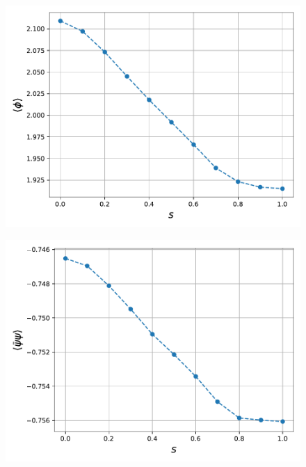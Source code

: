 \begin{figure}
    \centering
    \begin{minipage}{0.45\textwidth}
        \includegraphics[scale=0.52]{figures/slide_broken/phi.pdf}
        \label{fig:slide_broken_phi}
    \end{minipage}
    \hfill
    \begin{minipage}{0.45\textwidth}
        \includegraphics[scale=0.52]{figures/slide_broken/cond.pdf}
        \label{fig:slide_broken_cond}
    \end{minipage}
 \begin{minipage}{0.45\textwidth}

\end{minipage}
\end{figure}
